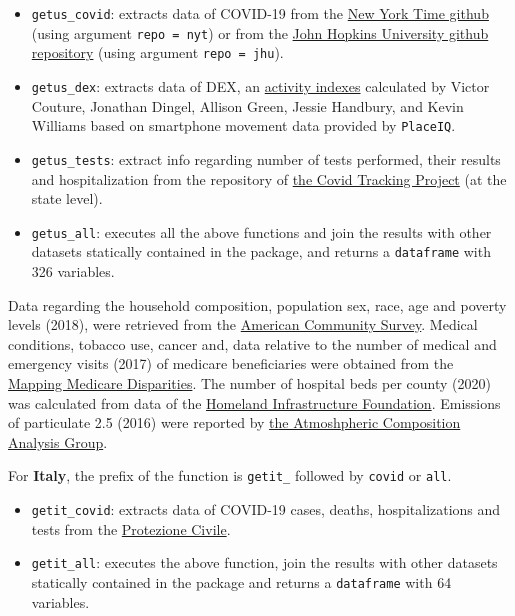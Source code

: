 \documentclass[12pt,halfline,a4paper,]{ouparticle}
\providecommand{\tightlist}{%
  \setlength{\itemsep}{0pt}\setlength{\parskip}{0pt}}
\begin{document}
\begin{itemize}
\tightlist
\item
  \texttt{getus\_covid}: extracts data of COVID-19 from the
  \href{https://github.com/nytimes/covid-19-data}{New York Time github}
  (using argument \texttt{repo\ =\ nyt}) or from the
  \href{https://github.com/CSSEGISandData}{John Hopkins University
  github repository} (using argument \texttt{repo\ =\ jhu}).
\item
  \texttt{getus\_dex}: extracts data of DEX, an
  \href{https://github.com/COVIDExposureIndices/COVIDExposureIndices}{activity
  indexes} calculated by Victor Couture, Jonathan Dingel, Allison Green,
  Jessie Handbury, and Kevin Williams based on smartphone movement data
  provided by \texttt{PlaceIQ}.
\item
  \texttt{getus\_tests}: extract info regarding number of tests
  performed, their results and hospitalization from the repository of
  \href{https://covidtracking.com/api\%7D}{the Covid Tracking Project}
  (at the state level).
\item
  \texttt{getus\_all}: executes all the above functions and join the
  results with other datasets statically contained in the package, and
  returns a \texttt{dataframe} with 326 variables.
\end{itemize}

Data regarding the household composition, population sex, race, age and
poverty levels (2018), were retrieved from the
\href{https://data.census.gov/cedsci/table?q=United\%20States}{American
Community Survey}. Medical conditions, tobacco use, cancer and, data
relative to the number of medical and emergency visits (2017) of
medicare beneficiaries were obtained from the
\href{https://data.cms.gov/mapping-medicare-disparities}{Mapping
Medicare Disparities}. The number of hospital beds per county (2020) was
calculated from data of the
\href{https://hifld-geoplatform.opendata.arcgis.com/datasets/hospitals/data?page=18}{Homeland
Infrastructure Foundation}. Emissions of particulate 2.5 (2016) were
reported by
\href{http://fizz.phys.dal.ca/~atmos/martin/?page_id=140\#V4.NA.02.MAPLE}{the
Atmoshpheric Composition Analysis Group}.

For \textbf{Italy}, the prefix of the function is \texttt{getit\_}
followed by \texttt{covid} or \texttt{all}.

\begin{itemize}
\tightlist
\item
  \texttt{getit\_covid}: extracts data of COVID-19 cases, deaths,
  hospitalizations and tests from the
  \href{\%22https://raw.githubusercontent.com/pcm-dpc/COVID-19/master/dati-regioni/dpc-covid19-ita-regioni.csv\%22}{Protezione
  Civile}.
\item
  \texttt{getit\_all}: executes the above function, join the results
  with other datasets statically contained in the package and returns a
  \texttt{dataframe} with 64 variables.
\end{itemize}
\end{document}
